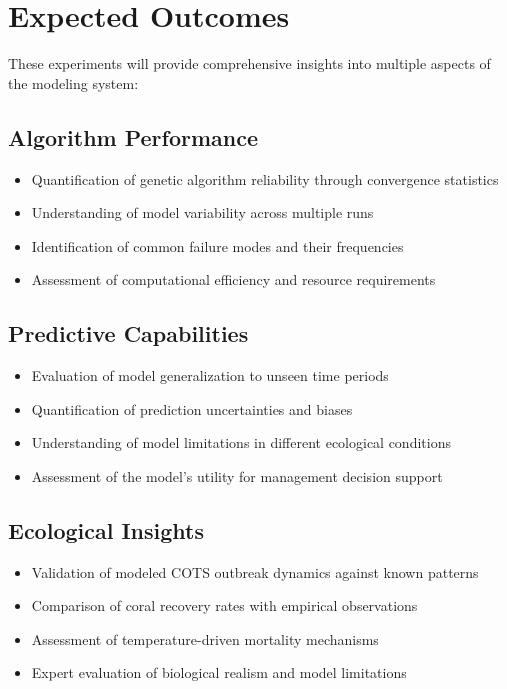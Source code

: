 \section{Expected Outcomes}

These experiments will provide comprehensive insights into multiple aspects of the modeling system:

\subsection{Algorithm Performance}
\begin{itemize}
\item Quantification of genetic algorithm reliability through convergence statistics
\item Understanding of model variability across multiple runs
\item Identification of common failure modes and their frequencies
\item Assessment of computational efficiency and resource requirements
\end{itemize}

\subsection{Predictive Capabilities}
\begin{itemize}
\item Evaluation of model generalization to unseen time periods
\item Quantification of prediction uncertainties and biases
\item Understanding of model limitations in different ecological conditions
\item Assessment of the model's utility for management decision support
\end{itemize}

\subsection{Ecological Insights}
\begin{itemize}
\item Validation of modeled COTS outbreak dynamics against known patterns
\item Comparison of coral recovery rates with empirical observations
\item Assessment of temperature-driven mortality mechanisms
\item Expert evaluation of biological realism and model limitations
\end{itemize}


